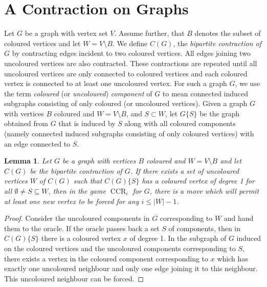 \documentclass[3p,times,12pt]{article}
\newtheorem{lemma}[theorem]{Lemma}
\DeclareMathOperator{\CCR}{CCR}
\begin{document}
\section{A Contraction on Graphs}
Let $G$ be a graph with vertex set $V$. Assume further, that $B$ denotes the subset of coloured vertices and let $W=V\setminus B$.  
We define $C(G)$, the {\em bipartite contraction of $G$}  by contracting edges incident to two coloured vertices. All edges joining two uncoloured vertices are also contracted.  These contractions are repeated until all uncoloured vertices are only connected to coloured vertices and each coloured vertex is connected to at least one uncoloured vertex.  
For such a graph $G$, we use the term {\em coloured} (or {\em uncoloured}) {\em component} of $G$ to mean connected induced subgraphs consisting of only coloured (or uncoloured vertices). Given a graph $G$ with vertices $B$ coloured and $W=V\setminus B$, and $S \subset W$, let $G\{S\}$ be the graph obtained from $G$ that is induced by $S$ along with all coloured components (namely connected induced subgraphs consisting of only coloured vertices) with an edge connected to $S$.



\begin{lemma}\label{lemma_bipart}
Let $G$ be a graph with vertices $B$ coloured and $W=V\setminus B$ and let $C(G)$ be the bipartite contraction of $G$.  If there exists a set of uncoloured vertices $W$ of $C(G)$ such that $C(G)\{S\}$ has a coloured vertex of degree 1 for all $\emptyset \neq S \subseteq W$, then in the game $\CCR_{i}$ for $G$, there is a move which will permit at least one new vertex to be forced  for any $i \leq |W|-1$.
\end{lemma}
\begin{proof}
Consider the uncoloured components in $G$ corresponding to $W$ and hand them to the oracle. If the oracle passes back a set $S$ of components, then in $C(G)\{S\}$  there is a coloured vertex $x$ of degree 1. In the subgraph of $G$ induced on the coloured vertices and the uncoloured components corresponding to $S$, there exists a vertex in the coloured component corresponding to $x$ which has exactly one uncoloured neighbour  and only one edge joining it to this neighbour.  This uncoloured neighbour can be forced.
\end{proof}
\end{document}
